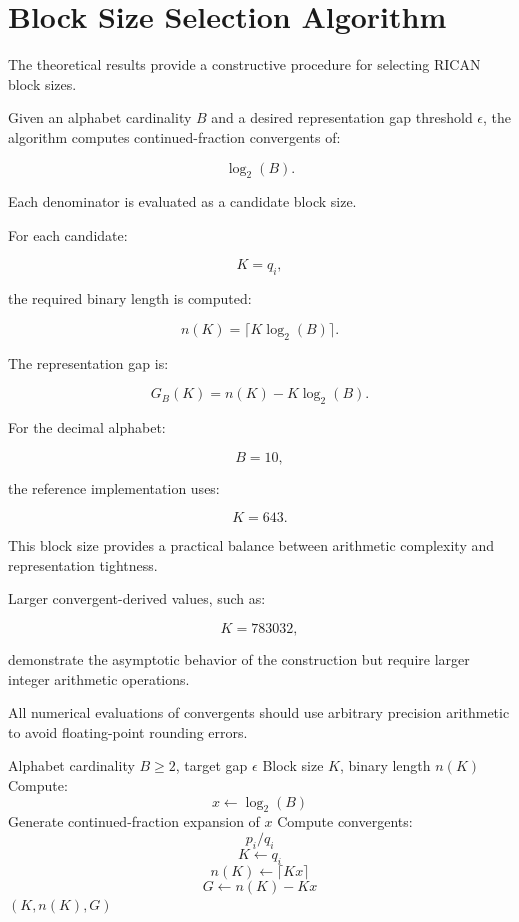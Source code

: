 \documentclass[onecolumn]{IEEEtran}
\begin{document}

\section{Block Size Selection Algorithm}

The theoretical results provide a constructive procedure for selecting
RICAN block sizes.

Given an alphabet cardinality $B$ and a desired representation gap
threshold $\epsilon$, the algorithm computes continued-fraction
convergents of:

\[
\log_2(B).
\]

Each denominator is evaluated as a candidate block size.

For each candidate:

\[
K=q_i,
\]

the required binary length is computed:

\[
n(K)=\lceil K\log_2(B)\rceil .
\]

The representation gap is:

\[
G_B(K)
=
n(K)-K\log_2(B).
\]

For the decimal alphabet:

\[
B=10,
\]

the reference implementation uses:

\[
K=643 .
\]

This block size provides a practical balance between arithmetic
complexity and representation tightness.

Larger convergent-derived values, such as:

\[
K=783032,
\]

demonstrate the asymptotic behavior of the construction but require
larger integer arithmetic operations.

All numerical evaluations of convergents should use arbitrary
precision arithmetic to avoid floating-point rounding errors.

\begin{algorithm}[!t]
\caption{RICAN Block Selection Using Continued Fractions}
\label{alg:block}
\begin{algorithmic}[1]
\REQUIRE Alphabet cardinality $B\geq2$, target gap $\epsilon$
\ENSURE Block size $K$, binary length $n(K)$
\STATE Compute:
\[
x\leftarrow\log_2(B)
\]
\STATE Generate continued-fraction expansion of $x$
\STATE Compute convergents:
\[
p_i/q_i
\]
\STATE
\[
K\leftarrow q_i
\]
\STATE
\[
n(K)\leftarrow\lceil Kx\rceil
\]
\STATE
\[
G\leftarrow n(K)-Kx
\]
\RETURN $(K,n(K),G)$
\ENDIF
\ENDFOR
\end{algorithmic}
\end{algorithm}
\end{document}
